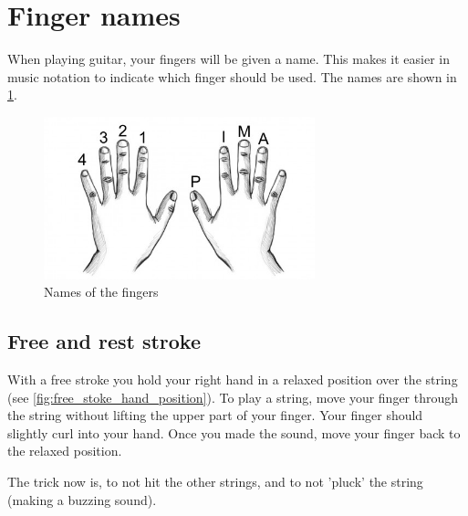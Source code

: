 \section{Finger names}

When playing guitar, your fingers will be given a name. This makes it easier in music notation to indicate which finger should be used. The names are shown in \ref{fig:finger_names}.

\begin{figure}[h]
    \centering
    \includegraphics[width=0.7\textwidth]{image/guitar-finger-tips_pima.jpg}
    \caption{Names of the fingers \cite{FingerNames}}
    \label{fig:finger_names}
\end{figure}

\subsection{Free and rest stroke}

With a free stroke you hold your right hand in a relaxed position over the string (see \ref{fig:free_stoke_hand_position}). To play a string, move your finger through the string without lifting the upper part of your finger. Your finger should slightly curl into your hand. Once you made the sound, move your finger back to the relaxed position.

The trick now is, to not hit the other strings, and to not 'pluck' the string (making a buzzing sound).

